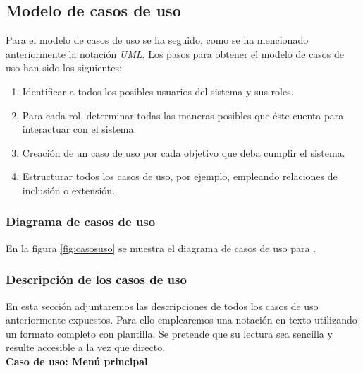 \subsection{Modelo de casos de uso}

Para el modelo de casos de uso se ha seguido, como se ha mencionado
anteriormente la notación \textit{UML}. Los pasos para obtener el modelo
de casos de uso han sido los siguientes:

\begin{enumerate}
    \itemsep0em
    \item Identificar a todos los posibles usuarios del sistema y sus roles.
    \item Para cada rol, determinar todas las maneras posibles que éste cuenta
    para interactuar con el sistema.
    \item Creación de un caso de uso por cada objetivo que deba cumplir
    el sistema.
    \item Estructurar todos los casos de uso, por ejemplo, empleando relaciones
    de inclusión o extensión.
\end{enumerate}

\subsubsection{Diagrama de casos de uso}

En la figura \ref{fig:casosuso} se muestra el diagrama de casos de uso
para \juego.\\


\subsubsection{Descripción de los casos de uso}

En esta sección adjuntaremos las descripciones de todos los casos de uso
anteriormente expuestos. Para ello emplearemos una notación en texto utilizando
un formato completo con plantilla. Se pretende que su lectura sea sencilla
y resulte accesible a la vez que directo.\\

\textbf{Caso de uso: Menú principal}

